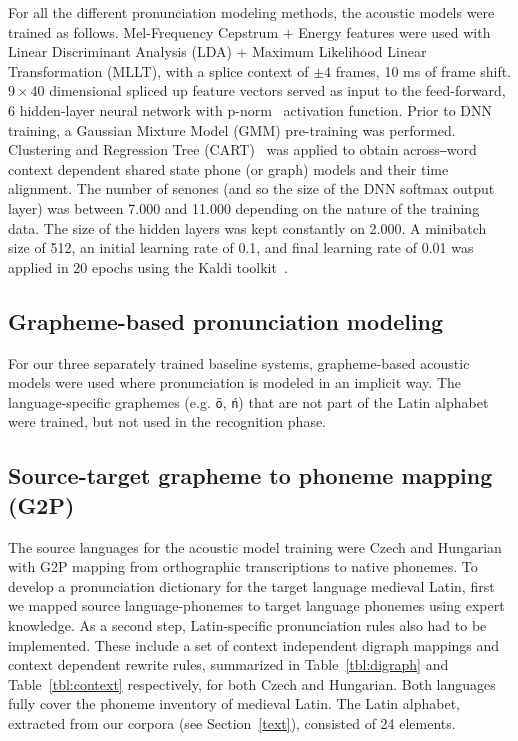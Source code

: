 \documentclass[runningheads,a4paper]{llncs}
\begin{document}
For all the different pronunciation modeling methods, the acoustic models were trained as follows.
Mel-Frequency Cepstrum $+$ Energy features were used with Linear Discriminant Analysis (LDA) + Maximum Likelihood Linear Transformation (MLLT), with a splice context of $\pm4$ frames, 10 ms of frame shift.
$9\times40$ dimensional spliced up feature vectors served as input to the feed-forward, 6 hidden-layer neural network with p-norm~\cite{kaldi} activation function.
Prior to DNN training, a Gaussian Mixture Model (GMM) pre-training was performed.
Clustering and Regression Tree (CART)~\cite{kaldi} was applied to obtain across‒word context dependent shared state phone (or graph) models and their time alignment.
The number of senones (and so the size of the DNN softmax output layer) was between 7.000 and 11.000 depending on the nature of the training data.
The size of the hidden layers was kept constantly on 2.000.
A minibatch size of 512, an initial learning rate of 0.1, and final learning rate of 0.01 was applied in 20 epochs using the Kaldi toolkit~\cite{kaldi}.

\subsection{Grapheme-based pronunciation modeling}\label{baseline}
For our three separately trained baseline systems, grapheme-based acoustic models were used where pronunciation is modeled in an implicit way.
The language-specific graphemes (e.g. \texttt{\"{o}}, \texttt{\'{n}}) that are not part of the Latin alphabet were trained, but not used in the recognition phase.

\subsection{Source-target grapheme to phoneme mapping (G2P)}\label{g2p}
The source languages for the acoustic model training were Czech and Hungarian with G2P mapping from orthographic transcriptions to native phonemes.
To develop a pronunciation dictionary for the target language medieval Latin, first we mapped source language-phonemes to target language phonemes using expert knowledge.
As a second step, Latin-specific pronunciation rules also had to be implemented.
These include a set of context independent digraph mappings and context dependent rewrite rules, summarized in Table~\ref{tbl:digraph} and Table~\ref{tbl:context} respectively, for both Czech and Hungarian.
Both languages fully cover the phoneme inventory of medieval Latin.
The Latin alphabet, extracted from our corpora (see Section~\ref{text}), consisted of 24 elements.
\end{document}
